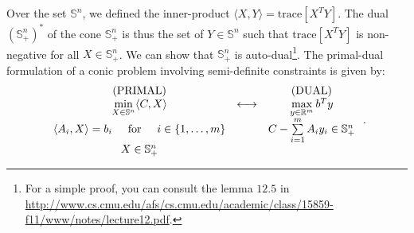 Over the set $\mathbb{S}^n$, we defined the inner-product $\langle X,Y \rangle = \mathrm{trace}[X^TY]$. The dual $(\mathbb{S}^n_+)^*$ of the cone $\mathbb{S}^n_+$ is thus the set of $Y\in\mathbb{S}^n$ such that $\mathrm{trace}[X^TY]$ is non-negative for all $X\in\mathbb{S}^n_+$. We can show that $\mathbb{S}^n_+$ is auto-dual\footnote{For a simple proof, you can consult the lemma $12.5$ in \url{http://www.cs.cmu.edu/afs/cs.cmu.edu/academic/class/15859-f11/www/notes/lecture12.pdf}.}. The primal-dual formulation of a conic problem involving semi-definite constraints is given by:
\begin{equation*}
\begin{array}{ccc}
    \text{(PRIMAL)} & & \text{(DUAL)} \\
    \min\limits_{X\in\mathbb{S}^n} \langle C,X \rangle & \longleftrightarrow & \max\limits_{y\in\mathbb{R}^m}  b^Ty \\
    \langle A_i,X \rangle = b_i \hspace{5mm} \text{for} \hspace{5mm} i\in\lbrace 1,\dots,m\rbrace & & C -\sum\limits_{i=1}^m A_iy_i \in \mathbb{S}^n_+ \\
    X \in \mathbb{S}^n_+ & &
\end{array} \:.
\end{equation*}

